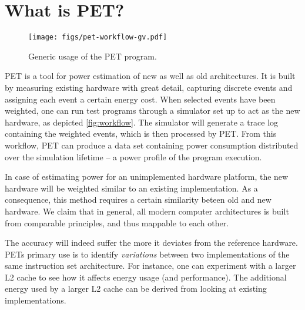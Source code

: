 \section{What is PET?}
\label{sec:whatispet}
\begin{figure}
    \texttt{[image: figs/pet-workflow-gv.pdf]}
    \caption{Generic usage of the PET program.}
    \label{fig:workflow}
\end{figure}

PET is a tool for power estimation of new as well as old architectures. It is
built by measuring existing hardware with great detail, capturing discrete events
and assigning each event a certain energy cost. When selected events have been
weighted, one can run test programs through a simulator set up to act as the
new hardware, as depicted \autoref{fig:workflow}. The simulator will generate a
trace log containing the weighted events, which is then processed by PET.
From this workflow, PET can produce a data set containing power consumption
distributed over the simulation lifetime -- a power profile of the program
execution.

In case of estimating power for an unimplemented hardware platform, the new
hardware will be weighted similar to an existing implementation. As a
consequence, this method requires a certain similarity beteen old and new
hardware. We claim that in general, all modern computer architectures is built
from comparable principles, and thus mappable to each other.

The accuracy will indeed suffer the more it deviates from the reference
hardware. PETs primary use is to identify \emph{variations} between two
implementations of the same instruction set architecture. For instance, one can
experiment with a larger L2 cache to see how it affects energy usage (and
performance). The additional energy used by a larger L2 cache can be derived
from looking at existing implementations.

